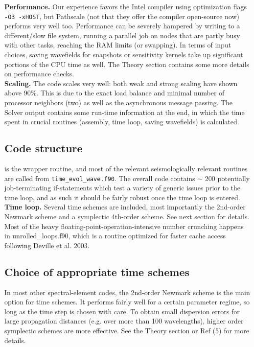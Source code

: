 \documentclass[11pt,letter,fleqn,english,notitlepage]{article}
\begin{document}
\noindent \textbf{Performance.} Our experience favors the Intel compiler using
optimization flags {\tt -O3 -xHOST}, but Pathscale (not that they offer the
compiler open-source now) performs very well too.  Performance can be severely
hampered by writing to a different/slow file system, running a parallel job on
nodes that are partly busy with other tasks, reaching the RAM limits (or
swapping). In terms of input choices, saving wavefields for snapshots or
sensitivity kernels take up significant portions of the CPU time as well. The
Theory section contains some more details on performance checks.\\

\noindent \textbf{Scaling.} The code scales very well: both weak and strong
scaling have shown above 90\%.  This is due to the exact load balance and
minimal number of processor neighbors (two) as well as the asynchronous message
passing. The Solver output contains some run-time information at the end, in
which the time spent in crucial routines (assembly, time loop, saving
wavefields) is calculated. 

\subsection{Code structure}
 is the wrapper routine, and most of the relevant
seismologically relevant routines are called from {\tt time\_evol\_wave.f90}.
The overall code contains $\sim$ 200 potentially job-terminating if-statements
which test a variety of generic issues prior to the time loop, and as such it
should be fairly robust once the time loop is entered. \\

\noindent \textbf{Time loop.} 
Several time schemes are included, most importantly the 2nd-order Newmark
scheme and a symplectic 4th-order scheme. See next section for details.  Most
of the heavy floating-point-operation-intensive number crunching happens in
unrolled\_loops.f90, which is a routine optimized for faster cache access
following Deville et al. 2003. 

\subsection{Choice of appropriate time schemes}
In most other spectral-element codes, the 2nd-order Newmark scheme is the main
option for time schemes. It performs fairly well for a certain parameter
regime, so long as the time step is chosen with care. To obtain small
dispersion errors for large propagation distances (e.g. over more than 100
wavelengths), higher order symplectic schemes are more effective. See the
Theory section or Ref (5) for more details.\\
\end{document}
